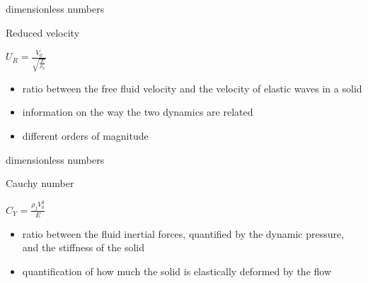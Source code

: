 \documentclass[10pt,t]{beamer}
\begin{document}
\begin{frame}{dimensionless numbers}
\label{dimensionless}
\begin{exampleblock}{Reduced velocity}

\begin{center}
    $U_R = \frac{V_0}{\sqrt{\frac{E}{\rho_S}}}$
\end{center}

\end{exampleblock}

\vspace{0.8cm}

\begin{itemize}
    \item ratio between the free fluid velocity and the velocity of elastic waves in a solid
    \item information on the way the two dynamics are related
    \item different orders of magnitude
\end{itemize}

\end{frame}


\begin{frame}{dimensionless numbers}

\begin{exampleblock}{Cauchy number}

\begin{center}
    $C_Y = \frac{\rho_f V_0^2}{E}$
\end{center}


\end{exampleblock}

\vspace{0.8cm}

\begin{itemize}
    \item ratio between the fluid inertial forces, quantified by the dynamic pressure, and the stiffness of the solid
    \item quantification of how much the solid is elastically deformed by the flow
\end{itemize}

\vspace{0.8cm}

\hyperlink{addedmass}{}

\end{frame}
\end{document}
